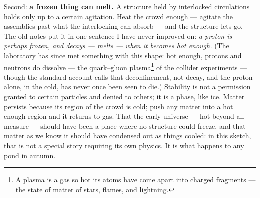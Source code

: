 \documentclass[fontsize=11pt,paper=a4,pagesize=auto,parskip=half-]{scrbook}
\begin{document}
Second: \textbf{a frozen thing can melt.} A structure held by interlocked circulations holds only up to a certain agitation. Heat the crowd enough --- agitate the assemblies past what the interlocking can absorb --- and the structure lets go. The old notes put it in one sentence I have never improved on: \emph{a proton is perhaps frozen, and decays --- melts --- when it becomes hot enough.} (The laboratory has since met something with this shape: hot enough, protons and neutrons do dissolve --- the quark--gluon plasma\footnote{A plasma is a gas so hot its atoms have come apart into charged fragments --- the state of matter of stars, flames, and lightning.} of the collider experiments --- though the standard account calls that deconfinement, not decay, and the proton alone, in the cold, has never once been seen to die.) Stability is not a permission granted to certain particles and denied to others; it is a phase, like ice. Matter persists because its region of the crowd is cold; push any matter into a hot enough region and it returns to gas. That the early universe --- hot beyond all measure --- should have been a place where no structure could freeze, and that matter as we know it should have condensed out as things cooled: in this sketch, that is not a special story requiring its own physics. It is what happens to any pond in autumn.
\end{document}
